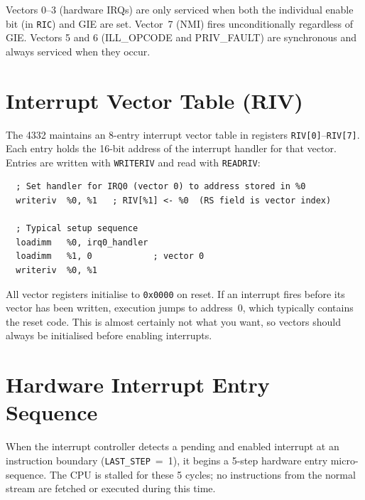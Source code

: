 \documentclass[a4paper,12pt]{report}
\newcommand{\asm}[1]{\texttt{#1}}
\newcommand{\field}[1]{\texttt{\small #1}}
\begin{document}
Vectors 0--3 (hardware IRQs) are only serviced when both the individual enable bit (in \asm{RIC}) and GIE are set. Vector~7 (NMI) fires unconditionally regardless of GIE. Vectors 5 and 6 (ILL\_OPCODE and PRIV\_FAULT) are synchronous and always serviced when they occur.

\section{Interrupt Vector Table (RIV)}

The 4332 maintains an 8-entry interrupt vector table in registers \asm{RIV[0]}--\asm{RIV[7]}. Each entry holds the 16-bit address of the interrupt handler for that vector. Entries are written with \asm{WRITERIV} and read with \asm{READRIV}:

\begin{lstlisting}
  ; Set handler for IRQ0 (vector 0) to address stored in %0
  writeriv  %0, %1   ; RIV[%1] <- %0  (RS field is vector index)

  ; Typical setup sequence
  loadimm   %0, irq0_handler
  loadimm   %1, 0            ; vector 0
  writeriv  %0, %1
\end{lstlisting}

All vector registers initialise to \texttt{0x0000} on reset. If an interrupt fires before its vector has been written, execution jumps to address~0, which typically contains the reset code. This is almost certainly not what you want, so vectors should always be initialised before enabling interrupts.

\section{Hardware Interrupt Entry Sequence}
\label{sec:int-entry}

When the interrupt controller detects a pending and enabled interrupt at an instruction boundary (\field{LAST\_STEP}~=~1), it begins a 5-step hardware entry micro-sequence. The CPU is stalled for these 5 cycles; no instructions from the normal stream are fetched or executed during this time.
\end{document}

